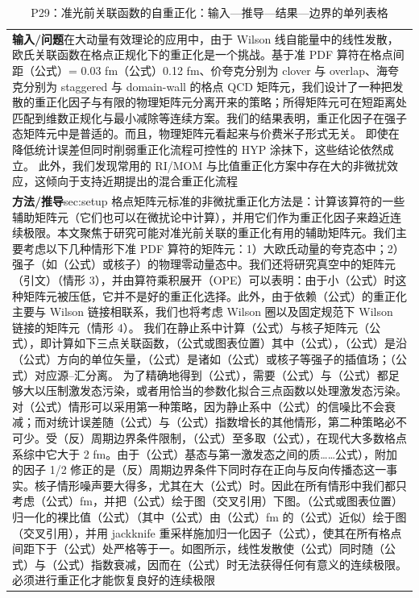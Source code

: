 \documentclass[UTF8,11pt,oneside]{ctexbook}
\begin{document}
\begin{table}[htbp]
  \centering
  \caption*{P29：准光前关联函数的自重正化：输入—推导—结果—边界的单列表格}
  \small
  \begin{tabular}{@{}p{}@{}}
    \toprule
    \textbf{输入/问题}\quad 在大动量有效理论的应用中，由于 Wilson 线自能量中的线性发散，欧氏关联函数在格点正规化下的重正化是一个挑战。基于准 PDF 算符在格点间距（公式）= 0.03 fm（公式）0.12 fm、价夸克分别为 clover 与 overlap、海夸克分别为 staggered 与 domain-wall 的格点 QCD 矩阵元，我们设计了一种把发散的重正化因子与有限的物理矩阵元分离开来的策略；所得矩阵元可在短距离处匹配到维数正规化与最小减除等连续方案。我们的结果表明，重正化因子在强子态矩阵元中是普适的。而且，物理矩阵元看起来与价费米子形式无关。 即使在降低统计误差但同时削弱重正化流程可控性的 HYP 涂抹下，这些结论依然成立。 此外，我们发现常用的 RI/MOM 与比值重正化方案中存在大的非微扰效应，这倾向于支持近期提出的混合重正化流程 \\
    \textbf{方法/推导}\quad sec:setup 格点矩阵元标准的非微扰重正化方法是：计算该算符的一些辅助矩阵元（它们也可以在微扰论中计算），并用它们作为重正化因子来趋近连续极限。本文聚焦于研究可能对准光前关联的重正化有用的辅助矩阵元。我们主要考虑以下几种情形下准 PDF 算符的矩阵元：1）大欧氏动量的夸克态中；2）强子（如（公式）或核子）的物理零动量态中。我们还将研究真空中的矩阵元（引文）（情形 3），并由算符乘积展开（OPE）可以表明：由于小（公式）时这种矩阵元被压低，它并不是好的重正化选择。此外，由于依赖（公式）的重正化主要与 Wilson 链接相联系，我们也将考虑 Wilson 圈以及固定规范下 Wilson 链接的矩阵元（情形 4）。 我们在静止系中计算（公式）与核子矩阵元（公式），即计算如下三点关联函数，（公式或图表位置）其中（公式），（公式）是沿（公式）方向的单位矢量，（公式）是诸如（公式）或核子等强子的插值场；（公式）对应源–汇分离。 为了精确地得到（公式），需要（公式）与（公式）都足够大以压制激发态污染，或者用恰当的参数化拟合三点函数以处理激发态污染。对（公式）情形可以采用第一种策略，因为静止系中（公式）的信噪比不会衰减；而对统计误差随（公式）与（公式）指数增长的其他情形，第二种策略必不可少。受（反）周期边界条件限制，（公式）至多取（公式），在现代大多数格点系综中它大于 2 fm。由于（公式）基态与第一激发态之间的质……公式），附加的因子 1/2 修正的是（反）周期边界条件下同时存在正向与反向传播态这一事实。核子情形噪声要大得多，尤其在大（公式）时。因此在所有情形中我们都只考虑（公式）fm，并把（公式）绘于图（交叉引用）下图。（公式或图表位置）归一化的裸比值（公式）（其中（公式）由（公式）fm 的（公式）近似）绘于图（交叉引用），并用 jackknife 重采样施加归一化因子（公式），使其在所有格点间距下于（公式）处严格等于一。如图所示，线性发散使（公式）同时随（公式）与（公式）指数衰减，因而在（公式）时无法获得任何有意义的连续极限。必须进行重正化才能恢复良好的连续极限 \\

\end{tabular}
\end{table}
\end{document}
